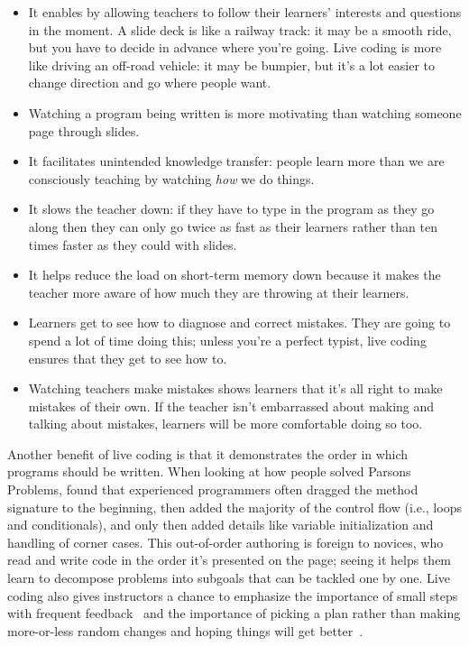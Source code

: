 \begin{itemize}

\item
  It enables 
  by allowing teachers to follow their learners' interests and questions in the moment.
  A slide deck is like a railway track:
  it may be a smooth ride,
  but you have to decide in advance where you're going.
  Live coding is more like driving an off-road vehicle:
  it may be bumpier,
  but it's a lot easier to change direction and go where people want.

\item
  Watching a program being written is more motivating
  than watching someone page through slides.

\item
  It facilitates unintended knowledge transfer:
  people learn more than we are consciously teaching
  by watching \emph{how} we do things.

\item
  It slows the teacher down:
  if they have to type in the program as they go along
  then they can only go twice as fast as their learners
  rather than ten times faster as they could with slides.

\item
  It helps reduce the load on short-term memory down
  because it makes the teacher more aware of how much they are throwing at their learners.

\item
  Learners get to see how to diagnose and correct mistakes.
  They are going to spend a lot of time doing this;
  unless you're a perfect typist,
  live coding ensures that they get to see how to.

\item
  Watching teachers make mistakes shows learners that
  it's all right to make mistakes of their own.
  If the teacher isn't embarrassed about making and talking about mistakes,
  learners will be more comfortable doing so too.

\end{itemize}

Another benefit of live coding is that it demonstrates the order in which programs should be written.
When looking at how people solved Parsons Problems,
\cite{Ihan2011} found that experienced programmers often dragged the method signature to the beginning,
then added the majority of the control flow (i.e., loops and conditionals),
and only then added details like variable initialization and handling of corner cases.
This out-of-order authoring is foreign to novices,
who read and write code in the order it's presented on the page;
seeing it helps them learn to decompose problems into subgoals that can be tackled one by one.
Live coding also gives instructors a chance to emphasize the importance of small steps with frequent feedback~\cite{Blik2014}
and the importance of picking a plan
rather than making more-or-less random changes and hoping things will get better~\cite{Spoh1985}.

